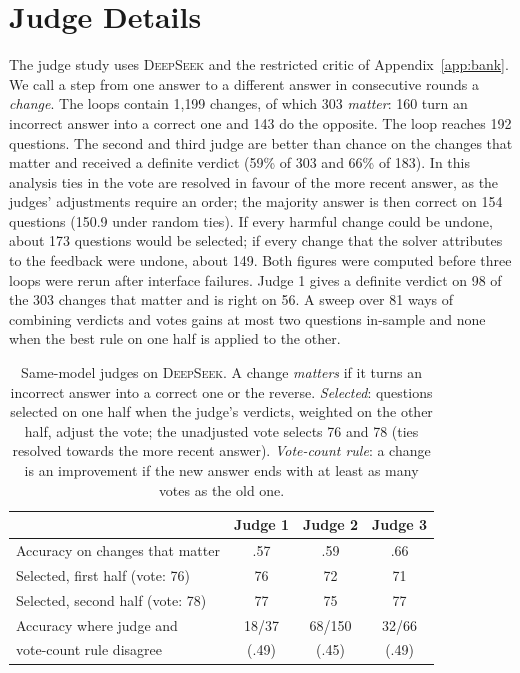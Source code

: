 \documentclass[11pt]{article}
\newcommand{\ds}{\textsc{DeepSeek}}
\begin{document}
\section{Judge Details}
\label{app:judges}

The judge study uses \ds{} and the restricted critic of Appendix~\ref{app:bank}.
We call a step from one answer to a different answer in consecutive rounds a \emph{change}.
The loops contain 1{,}199 changes, of which 303 \emph{matter}: 160 turn an incorrect answer into a correct one and 143 do the opposite.
The loop reaches 192 questions.
The second and third judge are better than chance on the changes that matter and received a definite verdict (59\% of 303 and 66\% of 183).
In this analysis ties in the vote are resolved in favour of the more recent answer, as the judges' adjustments require an order; the majority answer is then correct on 154 questions (150.9 under random ties).
If every harmful change could be undone, about 173 questions would be selected; if every change that the solver attributes to the feedback were undone, about 149. Both figures were computed before three loops were rerun after interface failures.
Judge 1 gives a definite verdict on 98 of the 303 changes that matter and is right on 56.
A sweep over 81 ways of combining verdicts and votes gains at most two questions in-sample and none when the best rule on one half is applied to the other.

\begin{table}[h]
\centering
\small
\setlength{\tabcolsep}{3.5pt}
\begin{tabular}{@{}l ccc@{}}
\toprule
 & Judge 1 & Judge 2 & Judge 3 \\
\midrule
Accuracy on changes that matter & .57 & .59 & .66 \\
Selected, first half (vote: 76) & 76 & 72 & 71 \\
Selected, second half (vote: 78) & 77 & 75 & 77 \\
Accuracy where judge and & 18/37 & 68/150 & 32/66 \\
\quad vote-count rule disagree & (.49) & (.45) & (.49) \\
\bottomrule
\end{tabular}
\caption{Same-model judges on \ds. A change \emph{matters} if it turns an incorrect answer into a correct one or the reverse. \emph{Selected}: questions selected on one half when the judge's verdicts, weighted on the other half, adjust the vote; the unadjusted vote selects 76 and 78 (ties resolved towards the more recent answer). \emph{Vote-count rule}: a change is an improvement if the new answer ends with at least as many votes as the old one.}
\label{tab:judges}
\end{table}
\end{document}
